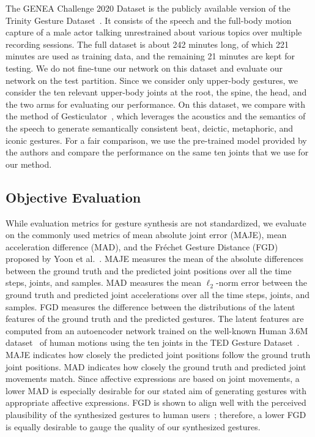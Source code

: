 \documentclass[conference,compsoc]{IEEEtran}
\theoremstyle{definition}
\begin{document}
The GENEA Challenge 2020 Dataset is the publicly available version of the Trinity Gesture Dataset~\cite{genea_2020,genea_2021}. It consists of the speech and the full-body motion capture of a male actor talking unrestrained about various topics over multiple recording sessions. The full dataset is about 242 minutes long, of which 221 minutes are used as training data, and the remaining 21 minutes are kept for testing. We do not fine-tune our network on this dataset and evaluate our network on the test partition. Since we consider only upper-body gestures, we consider the ten relevant upper-body joints at the root, the spine, the head, and the two arms for evaluating our performance. On this dataset, we compare with the method of Gesticulator~\cite{gesticulator}, which leverages the acoustics and the semantics of the speech to generate semantically consistent beat, deictic, metaphoric, and iconic gestures. For a fair comparison, we use the pre-trained model provided by the authors and compare the performance on the same ten joints that we use for our method.

\subsection{Objective Evaluation}
While evaluation metrics for gesture synthesis are not standardized, we evaluate on the commonly used metrics of mean absolute joint error (MAJE), mean acceleration difference (MAD), and the Fr\'echet Gesture Distance (FGD) proposed by Yoon et al.~\cite{trimodal}. MAJE measures the mean of the absolute differences between the ground truth and the predicted joint positions over all the time steps, joints, and samples. MAD measures the mean $\ell_2$-norm error between the ground truth and predicted joint accelerations over all the time steps, joints, and samples. FGD measures the difference between the distributions of the latent features of the ground truth and the predicted gestures. The latent features are computed from an autoencoder network trained on the well-known Human 3.6M dataset~\cite{human36m} of human motions using the ten joints in the TED Gesture Dataset~\cite{cospeech_gestures}. MAJE indicates how closely the predicted joint positions follow the ground truth joint positions. MAD indicates how closely the ground truth and predicted joint movements match. Since affective expressions are based on joint movements, a lower MAD is especially desirable for our stated aim of generating gestures with appropriate affective expressions. FGD is shown to align well with the perceived plausibility of the synthesized gestures to human users~\cite{trimodal}; therefore, a lower FGD is equally desirable to gauge the quality of our synthesized gestures.
\end{document}
